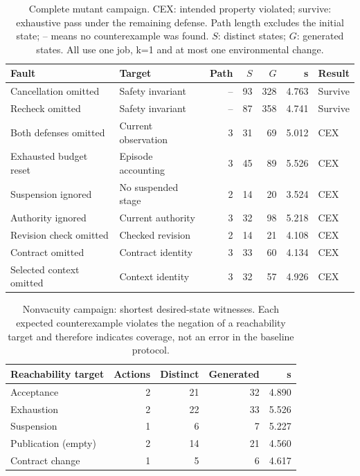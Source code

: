 \documentclass[pdflatex,sn-mathphys-num]{sn-jnl}
\theoremstyle{thmstyleone}
\theoremstyle{thmstylethree}
\theoremstyle{thmstyletwo}
\begin{document}
\begin{table}[tbp]
\centering
\caption{Complete mutant campaign. CEX: intended property violated; survive: exhaustive pass under the remaining defense. Path length excludes the initial state; -- means no counterexample was found. $S$: distinct states; $G$: generated states. All use one job, k=1 and at most one environmental change.}\label{tab:mutation-detail}
\scriptsize
\setlength{\tabcolsep}{3pt}
\renewcommand{\arraystretch}{1.13}
\begin{tabularx}{\linewidth}{@{}Xlrrrrl@{}}\toprule
Fault & Target & Path & $S$ & $G$ & s & Result\\\midrule
Cancellation omitted & Safety invariant & -- & 93 & 328 & 4.763 & Survive\\
Recheck omitted & Safety invariant & -- & 87 & 358 & 4.741 & Survive\\
Both defenses omitted & Current observation & 3 & 31 & 69 & 5.012 & CEX\\
Exhausted budget reset & Episode accounting & 3 & 45 & 89 & 5.526 & CEX\\
Suspension ignored & No suspended stage & 2 & 14 & 20 & 3.524 & CEX\\
Authority ignored & Current authority & 3 & 32 & 98 & 5.218 & CEX\\
Revision check omitted & Checked revision & 2 & 14 & 21 & 4.108 & CEX\\
Contract omitted & Contract identity & 3 & 33 & 60 & 4.134 & CEX\\
Selected context omitted & Context identity & 3 & 32 & 57 & 4.926 & CEX\\
\bottomrule\end{tabularx}
\end{table}

\begin{table}[tbp]
\centering
\caption{Nonvacuity campaign: shortest desired-state witnesses. Each expected counterexample violates the negation of a reachability target and therefore indicates coverage, not an error in the baseline protocol.}\label{tab:witness-detail}
\footnotesize
\setlength{\tabcolsep}{3pt}
\renewcommand{\arraystretch}{1.13}
\begin{tabularx}{\linewidth}{@{}Xrrrr@{}}\toprule
Reachability target & Actions & Distinct & Generated & s\\\midrule
Acceptance & 2 & 21 & 32 & 4.890\\
Exhaustion & 2 & 22 & 33 & 5.526\\
Suspension & 1 & 6 & 7 & 5.227\\
Publication (empty) & 2 & 14 & 21 & 4.560\\
Contract change & 1 & 5 & 6 & 4.617\\
\bottomrule\end{tabularx}
\end{table}
\end{document}
